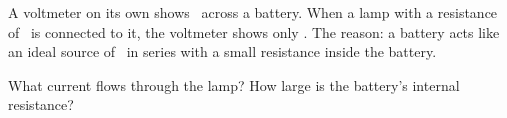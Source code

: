 A voltmeter on its own shows \VzO\ across a battery. When a lamp with a resistance of \RO\ is connected to it, the voltmeter shows only \VtO. The reason: a battery acts like an ideal source of \VzO\ in series with a small resistance inside the battery.

\begin{abcliste}
\abc What current flows through the lamp?
\abc How large is the battery's internal resistance?
\end{abcliste}
